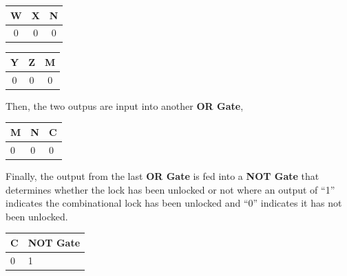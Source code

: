 \documentclass{article}
\begin{document}
\begin{minipage}[t]{0.5\linewidth}
    \begin{center}
        \begin{tabular}{ |c|c|c| }
            \hline
            {\bf W} & {\bf X} & {\bf N} \\
            \hline
            0 & 0 & 0\\
            \hline
        \end{tabular}
    \end{center}
\end{minipage}\hfill
\begin{minipage}[t]{0.5\linewidth}
    \begin{center}
        \begin{tabular}{ |c|c|c| }
            \hline
            {\bf Y} & {\bf Z} & {\bf M} \\
            \hline
            0 & 0 & 0\\
            \hline
        \end{tabular}
    \end{center}
\end{minipage}

\vspace{1cm}

Then, the two outpus are input into another {\bf OR Gate},

\vspace{1cm}
\begin{center}
    \begin{tabular}{ |p{2cm}|p{2cm}|p{2cm}| }
        \hline
        \hfil {\bf M} & \hfil {\bf N} & \hfil {\bf C} \\
        \hline
        \hfil 0 & \hfil 0 & \hfil 0\\
        \hline
    \end{tabular}
\end{center}

\vspace{1cm}

Finally, the output from the last {\bf OR Gate} is fed into a {\bf NOT Gate} that determines whether the lock has been unlocked or not where an output of ``1'' indicates the combinational lock has been unlocked and ``0'' indicates it has not been unlocked.


\vspace{1cm}
\begin{center}
    \begin{tabular}{ |p{2cm}|p{3cm}| }
        \hline
        \hfil {\bf C} & \hfil {\bf NOT Gate} \\
        \hline
        \hfil 0 & \hfil 1 \\
        \hline
    \end{tabular}
\end{center}
\end{document}
